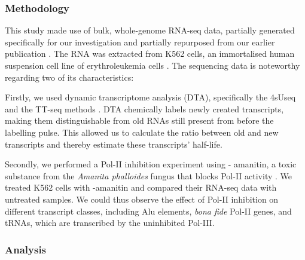 \subsubsection{Methodology}\label{subsubsec:alumethod}
This study made use of bulk, whole-genome RNA-seq data, partially generated
specifically for our investigation and partially repurposed from our earlier
publication \citet{Schwalb2016a}. The RNA was extracted from K562 cells, an
immortalised human suspension cell line of erythroleukemia cells
\citep{Andersson1979}. The sequencing data is noteworthy regarding two of its
characteristics:

Firstly, we used dynamic transcriptome analysis (DTA), specifically the 4sUseq
and the TT-seq methods \citep{Schwalb2012,Gressel2019}. DTA chemically labels
newly created transcripts, making them distinguishable from old RNAs still
present from before the labelling pulse. This allowed us to calculate the
ratio between old and new transcripts and thereby estimate these transcripts'
half-life.

Secondly, we performed a Pol-II inhibition experiment using \textalpha-%
amanitin, a toxic substance from the \textit{Amanita phalloides} fungus that
blocks Pol-II activity \citep{Lindell1970,Kedinger1970,Stirpe1967,Jacob1970}.
We treated K562 cells with \textalpha-amanitin and compared their RNA-seq data
with untreated samples. We could thus observe the effect of Pol-II inhibition
on different transcript classes, including Alu elements, \textit{bona fide}
Pol-II genes, and tRNAs, which are transcribed by the uninhibited Pol-III.

\subsubsection{Analysis}\label{subsubsec:aluanalysis}


